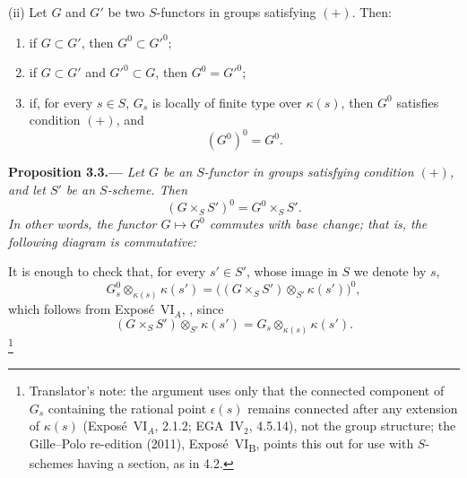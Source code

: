\textup{(ii)} Let \(G\) and \(G'\) be two \(S\)-functors in groups
satisfying \((+)\). Then:
\begin{enumerate}
\item[\textup{a)}] if \(G\subset G'\), then \(G^0\subset G'^0\);
\item[\textup{b)}] if \(G\subset G'\) and \(G'^0\subset G\), then
  \(G^0=G'^0\);
\item[\textup{c)}] if, for every \(s\in S\), \(G_s\) is locally of
  finite type over \(\kappa(s)\), then \(G^0\) satisfies condition
  \((+)\), and
  \[
    (G^0)^0=G^0.
  \]
\end{enumerate}

\medskip
{}\label{prop:sga3-VIB-3.3}%
\noindent\textbf{Proposition 3.3.---}
\emph{Let \(G\) be an \(S\)-functor in groups satisfying condition
\((+)\), and let \(S'\) be an \(S\)-scheme. Then}
\[
  (G\times_S S')^0=G^0\times_S S'.
\]
\emph{In other words, the functor \(G\mapsto G^0\) commutes with
base change; that is, the following diagram is commutative:}
\begin{center}
  \label{diag:sga3-VIB-3.3-base-change}%
\end{center}

It is enough to check that, for every \(s'\in S'\), whose image in
\(S\) we denote by \(s\),
\[
  G_s^0\otimes_{\kappa(s)}\kappa(s')
    =\bigl((G\times_S S')\otimes_{S'}\kappa(s')\bigr)^0,
\]
which follows from Expos\'e~VI\(_A\), , since
\[
  (G\times_S S')\otimes_{S'}\kappa(s')
    =G_s\otimes_{\kappa(s)}\kappa(s').
\]
\footnote{Translator's note: the argument uses only that the connected component of \(G_s\) containing
the rational point \(\epsilon(s)\) remains connected after any extension of \(\kappa(s)\) (Expos\'e~VI\(_A\),
2.1.2; EGA~IV\(_2\), 4.5.14), not the group structure; the Gille--Polo re-edition (2011),
Expos\'e~VI\textsubscript{B}, points this out for use with \(S\)-schemes having a section, as in 4.2.}

